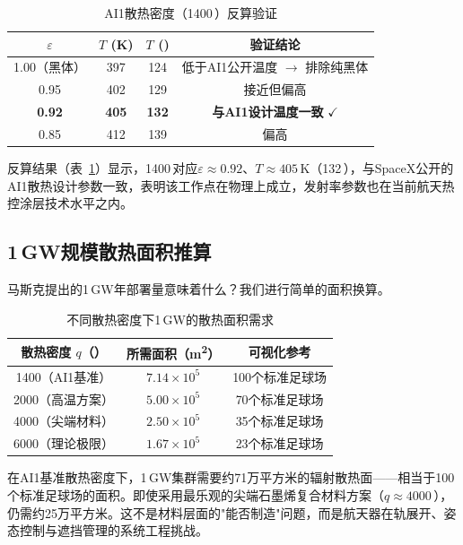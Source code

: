 \begin{table}[H]
\centering
\footnotesize
\caption{AI1散热密度（1400\,\unitWpm{}）反算验证}
\label{tab:ai1_verify}
\begin{tabular}{cccc}
\toprule
$\varepsilon$ & $T$ (K) & $T$ (\unitC{}) & 验证结论 \\
\midrule
1.00（黑体）& 397 & 124 & 低于AI1公开温度 $\rightarrow$ 排除纯黑体 \\
0.95          & 402 & 129 & 接近但偏高 \\
\textbf{0.92} & \textbf{405} & \textbf{132} & \textbf{与AI1设计温度一致} $\checkmark$ \\
0.85          & 412 & 139 & 偏高 \\
\bottomrule
\end{tabular}
\end{table}

反算结果（表~\ref{tab:ai1_verify}）显示，1400\,\unitWpm{}对应$\varepsilon\approx 0.92$、$T\approx 405$\,K（132\,\unitC{}），与SpaceX公开的AI1散热设计参数一致，表明该工作点在物理上成立，发射率参数也在当前航天热控涂层技术水平之内\cite{nasa1993thermal}。

\subsection{1\,GW规模散热面积推算}

马斯克提出的1\,GW年部署量\cite{musk2026terafab}意味着什么？我们进行简单的面积换算。

\begin{table}[H]
\centering
\footnotesize
\caption{不同散热密度下1\,GW的散热面积需求}
\label{tab:gw_area}
\begin{tabular}{ccc}
\toprule
散热密度 $q$（\unitWpm{}） & 所需面积（m\textsuperscript{2}） & 可视化参考 \\
\midrule
1400（AI1基准） & $7.14\times 10^{5}$ & 100个标准足球场 \\
2000（高温方案） & $5.00\times 10^{5}$ & 70个标准足球场 \\
4000（尖端材料\cite{kanti2025graphene}） & $2.50\times 10^{5}$ & 35个标准足球场 \\
6000（理论极限） & $1.67\times 10^{5}$ & 23个标准足球场 \\
\bottomrule
\end{tabular}
\end{table}

在AI1基准散热密度下，1\,GW集群需要约71万平方米的辐射散热面——相当于100个标准足球场的面积。即使采用最乐观的尖端石墨烯复合材料方案\cite{kanti2025graphene}（$q\approx4000$\,\unitWpm{}），仍需约25万平方米。这不是材料层面的"能否制造"问题，而是航天器在轨展开、姿态控制与遮挡管理的系统工程挑战。

